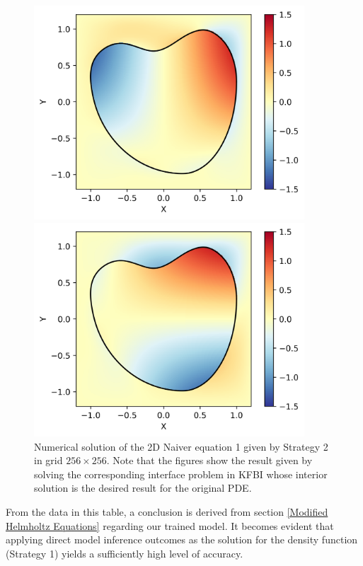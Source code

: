 \documentclass{article}
\begin{document}
\begin{figure}[htb]
\centering
\begin{minipage}[t]{0.45\textwidth}
\centering
\includegraphics[width=0.9\textwidth]{v1.png}
\end{minipage}
\begin{minipage}[t]{0.45\textwidth}
\centering
\includegraphics[width=0.9\textwidth]{v2.png}
\end{minipage}
\caption{Numerical solution of the 2D Naiver equation 1 given by Strategy 2 in grid $256 \times 256$. Note that the figures show the result given by solving the corresponding interface problem in KFBI whose interior solution is the desired result for the original PDE.}
\label{fig:naiver2D}
\end{figure}
From the data in this table, a conclusion is derived from section \ref{Modified Helmholtz Equations} regarding our trained model. It becomes evident that applying direct model inference outcomes as the solution for the density function (Strategy 1) yields a sufficiently high level of accuracy.
\end{document}
